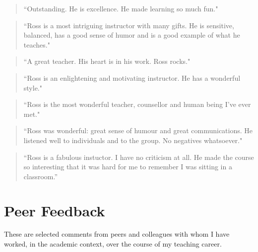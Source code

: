 \documentclass[10pt,DIV09,letterpaper,oneside,headsepline]{scrreprt}
\begin{document}
\begin{quote} ``Outstanding. He is excellence. He made learning so much fun." \end{quote}

\begin{quote} ``Ross is a most intriguing instructor with many gifts. He is sensitive, balanced, has a good sense of humor and is a good example of what he teaches." \end{quote}

\begin{quote} ``A great teacher. His heart is in his work. Ross rocks." \end{quote}

\begin{quote} ``Ross is an enlightening and motivating instructor. He has a wonderful style." \end{quote}

\begin{quote} ``Ross is the most wonderful teacher, counsellor and human being I've ever met." \end{quote}

\begin{quote} ``Ross was wonderful: great sense of humour and great communications. He listened well to individuals and to the group. No negatives whatsoever." \end{quote}

\begin{quote} ``Ross is a fabulous instuctor. I have no criticism at all. He made the course so interesting that it was hard for me to remember I was sitting in a classroom.'' \end{quote}

\chapter{Peer Feedback}
These are selected comments from peers and colleagues with whom I have worked, in the academic context, over the course of my teaching career.
\end{document}
